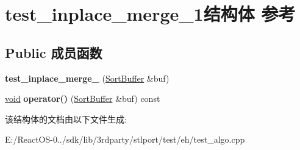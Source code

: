 \hypertarget{structtest__inplace__merge__1}{}\section{test\+\_\+inplace\+\_\+merge\+\_\+1结构体 参考}
\label{structtest__inplace__merge__1}
\subsection*{Public 成员函数}
\begin{DoxyCompactItemize}
\item 
\mbox{\label{structtest__inplace__merge__1_a0131d689ef0e777b89266c935a0fb771}} 
{\bfseries test\+\_\+inplace\+\_\+merge\+\_} (\hyperlink{struct_sort_buffer}{Sort\+Buffer} \&buf)
\item 
\mbox{\label{structtest__inplace__merge__1_ac82c0dc3a35a41c95013196a84ff2267}} 
\hyperlink{interfacevoid}{void} {\bfseries operator()} (\hyperlink{struct_sort_buffer}{Sort\+Buffer} \&buf) const
\end{DoxyCompactItemize}


该结构体的文档由以下文件生成\+:\begin{DoxyCompactItemize}
\item 
E\+:/\+React\+O\+S-\/0../sdk/lib/3rdparty/stlport/test/eh/test\+\_\+algo.\+cpp\end{DoxyCompactItemize}
